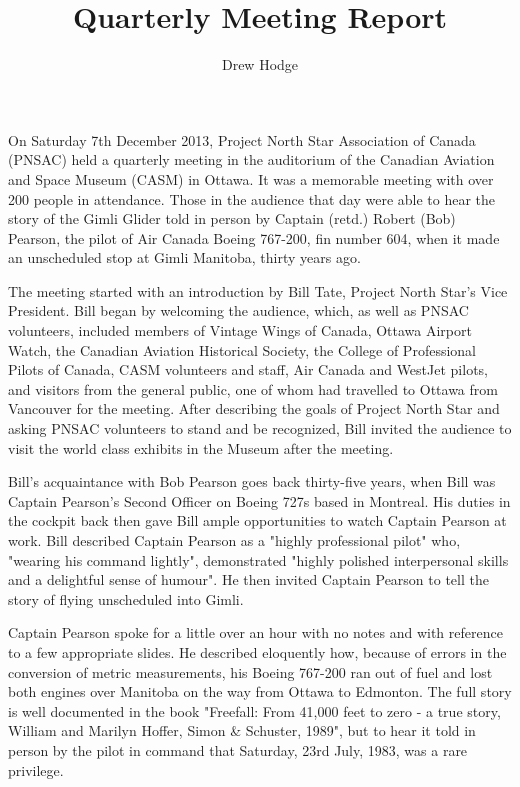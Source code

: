 



\title{Quarterly Meeting Report}
\author{Drew Hodge}

\maketitle

On Saturday 7th December 2013, Project North Star Association of
Canada (PNSAC) held a quarterly meeting in the auditorium of the
Canadian Aviation and Space Museum (CASM) in Ottawa. It was a
memorable meeting with over 200 people in attendance. Those in the
audience that day were able to hear the story of the Gimli Glider told
in person by Captain (retd.) Robert (Bob) Pearson, the pilot of Air
Canada Boeing 767-200, fin number 604, when it made an unscheduled
stop at Gimli Manitoba, thirty years ago.

The meeting started with an introduction by Bill Tate, Project North
Star's Vice President.  Bill began by welcoming the audience, which,
as well as PNSAC volunteers, included members of Vintage Wings of
Canada, Ottawa Airport Watch, the Canadian Aviation Historical
Society, the College of Professional Pilots of Canada, CASM volunteers
and staff, Air Canada and WestJet pilots, and visitors from the
general public, one of whom had travelled to Ottawa from Vancouver for
the meeting. After describing the goals of Project North Star and
asking PNSAC volunteers to stand and be recognized, Bill invited the
audience to visit the world class exhibits in the Museum after the
meeting.

Bill's acquaintance with Bob Pearson goes back thirty-five years, when
Bill was Captain Pearson's Second Officer on Boeing 727s based in
Montreal. His duties in the cockpit back then gave Bill ample
opportunities to watch Captain Pearson at work. Bill described Captain
Pearson as a "highly professional pilot" who, "wearing his command
lightly", demonstrated "highly polished interpersonal skills and a
delightful sense of humour".  He then invited Captain Pearson to tell
the story of flying unscheduled into Gimli.

Captain Pearson spoke for a little over an hour with no notes and with
reference to a few appropriate slides.  He described eloquently how,
because of errors in the conversion of metric measurements, his Boeing
767-200 ran out of fuel and lost both engines over Manitoba on the way
from Ottawa to Edmonton. The full story is well documented in the book
"Freefall: From 41,000 feet to zero - a true story, William and
Marilyn Hoffer, Simon \& Schuster, 1989", but to hear it told in
person by the pilot in command that Saturday, 23rd July, 1983, was a
rare privilege.

